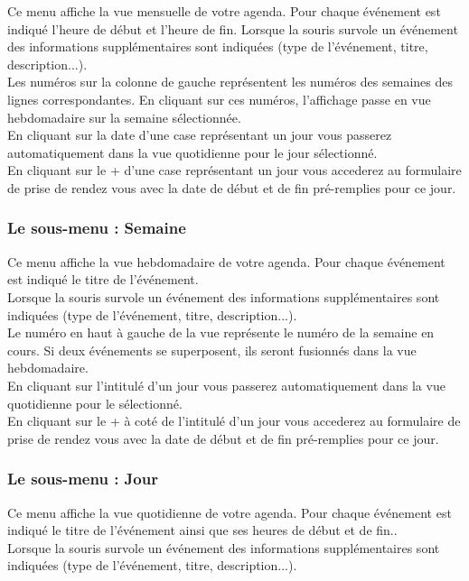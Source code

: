 Ce menu affiche la vue mensuelle de votre agenda.
Pour chaque événement est indiqué l'heure de début et l'heure de fin.
Lorsque la souris survole un événement des informations supplémentaires 
sont indiquées (type de l'événement, titre, description...).\\

Les numéros sur la colonne de gauche représentent les numéros des semaines
des lignes correspondantes.
En cliquant sur ces numéros, l'affichage passe en vue hebdomadaire sur la semaine sélectionnée.\\

En cliquant sur la date d'une case représentant un jour vous passerez
automatiquement dans la vue quotidienne pour le jour sélectionné.\\

En cliquant sur le + d'une case représentant un jour vous accederez au 
formulaire de prise de rendez vous avec la date de début et de fin 
pré-remplies pour ce jour.

\subsubsection{Le sous-menu : Semaine}

Ce menu affiche la vue hebdomadaire de votre agenda.
Pour chaque événement est indiqué le titre de l'événement.\\
Lorsque la souris survole un événement des informations supplémentaires 
sont indiquées (type de l'événement, titre, description...).\\
Le numéro en haut à gauche de la vue représente le numéro de la semaine en
cours.
Si deux événements se superposent, ils seront fusionnés dans la vue
hebdomadaire.\\
En cliquant sur l'intitulé d'un jour vous passerez automatiquement dans la vue
quotidienne pour le sélectionné.\\
En cliquant sur le + à coté de l'intitulé d'un jour vous accederez au 
formulaire de prise de rendez vous avec la date de début et de fin 
pré-remplies pour ce jour.

\subsubsection{Le sous-menu : Jour}

Ce menu affiche la vue quotidienne de votre agenda.
Pour chaque événement est indiqué le titre de l'événement ainsi que ses
heures de début et de fin..\\
Lorsque la souris survole un événement des informations supplémentaires 
sont indiquées (type de l'événement, titre, description...).\\

